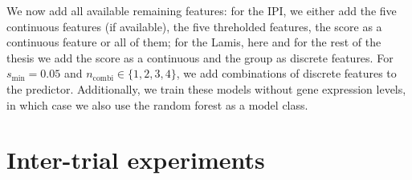 We now add all available remaining features: for the 
IPI, we either add the five continuous features (if available), the five threholded features, the 
score as a continuous feature or all of them; for the Lamis, here and for the rest of the thesis we 
add the score as a continuous and the group as discrete features. For $s_\text{min} = \num{0.05}$ and 
$n_\text{combi} \in \{1, 2, 3, 4 \}$, we add combinations of discrete features to the predictor. 
Additionally, we train these models without gene expression levels, in which case we also use the 
random forest as a model class.

\subsection{}

\section{Inter-trial experiments}

